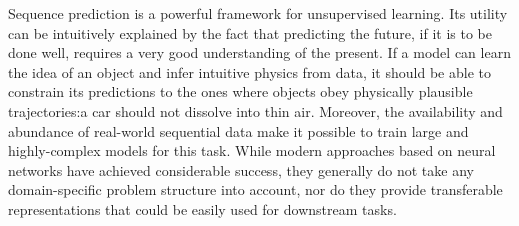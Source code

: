 %
    
    
    
    
    
    
    
    
    
    
    

    Sequence prediction is a powerful framework for unsupervised learning.
    Its utility can be intuitively explained by the fact that predicting the future, if it is to be done well, requires a very good understanding of the present. 
    If a model can learn the idea of an object and infer intuitive physics from data, it should be able to constrain its predictions to the ones where objects obey physically plausible trajectories:\eg a car should not dissolve into thin air.
    Moreover, the availability and abundance of real-world sequential data make it possible to train large and highly-complex models for this task.
    While modern approaches based on neural networks have achieved considerable success, they generally do not take any domain-specific problem structure into account, nor do they provide transferable representations that could be easily used for downstream tasks.         
    
